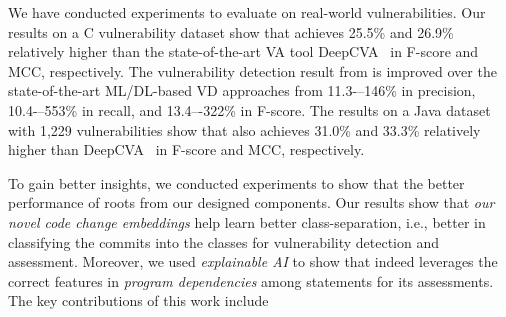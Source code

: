 

We have conducted experiments to evaluate {\tool} on real-world
vulnerabilities. Our results on a C vulnerability dataset show that
{\tool} achieves 25.5\% and 26.9\% relatively higher than the
state-of-the-art VA tool DeepCVA~\cite{deepCVA-ase21} in F-score and
MCC, respectively. The vulnerability detection result from {\tool} is
improved over the state-of-the-art ML/DL-based VD approaches from
11.3-–146\% in precision, 10.4-–553\% in recall, and 13.4–-322\% in
F-score.
The results on a Java dataset with 1,229 vulnerabilities show that
{\tool} also achieves 31.0\% and 33.3\% relatively higher
than DeepCVA~\cite{deepCVA-ase21} in F-score and MCC, respectively.


To gain better insights, we conducted experiments to show that the better
performance of {\tool} roots from our designed components.
Our results show that {\em our novel code change embeddings} help
{\tool} learn better class-separation, i.e., better in classifying the
commits into the classes for vulnerability detection and
assessment. Moreover, we used {\em explainable AI} to show
that {\tool} indeed leverages the correct features in {\em program
  dependencies} among statements for its assessments.
The key contributions of this work include

